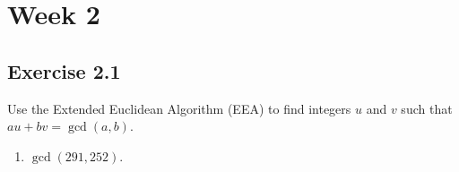 \section*{Week 2}

\subsection*{Exercise 2.1}
Use the Extended Euclidean Algorithm (EEA) to find integers $u$ and $v$ such that $au+bv=\gcd(a,b)$.
\begin{enumerate}
    \item $\gcd(291, 252)$.
\end{enumerate}

